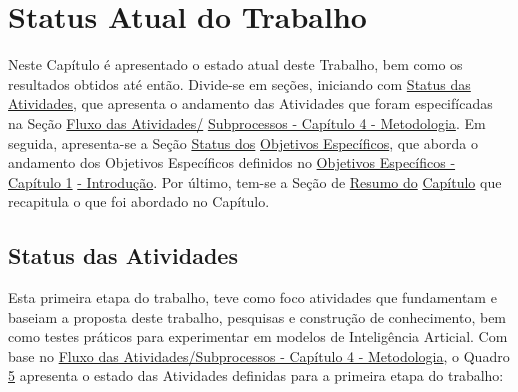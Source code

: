 \chapter[Conclusão]{Status Atual do Trabalho}\label{chap:conclusao}

Neste Capítulo é apresentado o estado atual deste Trabalho, bem como os resultados obtidos até então. Divide-se em seções,
iniciando com \hyperref[sec:atvstat]{Status das Atividades}, que apresenta o andamento das Atividades que foram especifícadas
na Seção \hyperref[sec:fluxoatv]{Fluxo das Atividades/} \hyperref[sec:fluxoatv]{Subprocessos - Capítulo 4 - Metodologia}. Em seguida, apresenta-se a 
Seção \hyperref[sec:estobjesp]{Status dos} \hyperref[sec:estobjesp]{Objetivos Específicos}, que aborda o andamento dos Objetivos Específicos definidos
no \hyperref[subsec:objesp]{Objetivos Específicos - Capítulo 1} \hyperref[subsec:objesp]{ - Introdução}. Por último, tem-se a Seção de
\hyperref[sec:resumoconc]{Resumo do} \hyperref[sec:resumoconc]{Capítulo} que recapitula o que foi abordado no Capítulo.

\section{Status das Atividades}\label{sec:atvstat}
Esta primeira etapa do trabalho, teve como foco atividades que fundamentam e baseiam a proposta deste trabalho,
pesquisas e construção de conhecimento, bem como testes práticos para experimentar em modelos de Inteligência Articial.
Com base no \hyperref[sec:fluxoatv]{Fluxo das Atividades/Subprocessos - Capítulo 4 - Metodologia}, o Quadro \hyperref[tab:5]{5}
apresenta o estado das Atividades definidas para a primeira etapa do trabalho:

